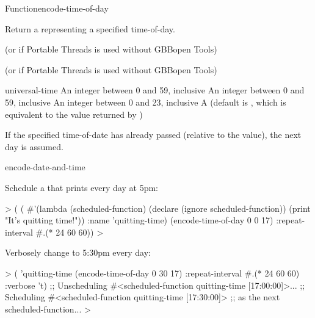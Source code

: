\documentclass[10pt,twoside,english,pdftex]{article}
\begin{document}
\begin{functiondoc}{Function}{encode-time-of-day}%
  { 
    }

\fnsyntax

\fnpurpose Return a  representing a specified
time-of-day.

\fnpackage {} (or  if Portable
Threads is used without GBBopen Tools)

\fnmodule {} (or  if Portable
Threads is used without GBBopen Tools)

\fnargs
\begin{args}{universal-time}
\arg[second] An integer between 0 and 59, inclusive
\arg[minute] An integer between 0 and 59, inclusive
\arg[hour] An integer between 0 and 23, inclusive
 A  (default is \nil,
  which is equivalent to the value returned by
  )
\end{args}

\fndescription If the specified time-of-date has already passed (relative to
the  value), the next day is assumed.

\begin{alsos}{encode-date-and-time}
\end{alsos}

%
%
\fnexamples
Schedule a  that prints  
every day at 5pm:
%
\W\supp
\begin{example}
  > (
      (
        #'(lambda (scheduled-function)
            (declare (ignore scheduled-function))
            (print "It's quitting time!"))
        :name 'quitting-time)
       (encode-time-of-day 0 0 17) :repeat-interval #.(* 24 60 60))
  >
\end{example}

%
Verbosely change  to 5:30pm every day:
%
\W\supp
\begin{example}
  > ( 'quitting-time (encode-time-of-day 0 30 17)
      :repeat-interval #.(* 24 60 60)
      :verbose 't)
  ;; Unscheduling #<scheduled-function quitting-time [17:00:00]>...
  ;; Scheduling #<scheduled-function quitting-time [17:30:00]> 
  ;; as the next scheduled-function...
  >
\end{example}

\end{functiondoc}
\end{document}
